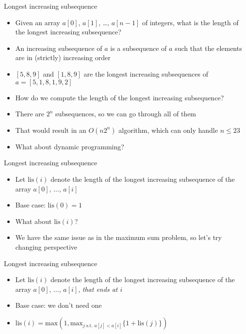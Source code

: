 \documentclass[12pt,t]{beamer}
\newcommand{\bi}{\begin{itemize}}
\newcommand{\ei}{\end{itemize}}
\begin{document}
\begin{frame}{Longest increasing subsequence}
    \bi
\item Given an array $a[0]$, $a[1]$, \ldots, $a[n-1]$ of integers, what is the length of the longest increasing subsequence?
    \vspace{5pt}
\item An increasing subsequence of $a$ is a subsequence of $a$ such that the elements are in (strictly) increasing order
    \vspace{5pt}
\item $[5,8,9]$ and $[1,8,9]$ are the longest increasing subsequences of $a = [5,1,8,1,9,2]$

    \vspace{5pt}
\item How do we compute the length of the longest increasing subsequence?
\item There are $2^n$ subsequences, so we can go through all of them
\item That would result in an $O(n2^n)$ algorithm, which can only handle $n\leq 23$
    \vspace{5pt}
\item What about dynamic programming?

    \ei
\end{frame}

\begin{frame}{Longest increasing subsequence}
    \vspace{20pt}
    \bi
\item Let $\mathrm{lis}(i)$ denote the length of the longest increasing subsequence of the array $a[0]$, $\ldots$, $a[i]$
    \vspace{5pt}
\item Base case: $\mathrm{lis}(0) = 1$
\item What about $\mathrm{lis}(i)$?
    \vspace{10pt}
\item We have the same issue as in the maximum sum problem, so let's try changing perspective
    \ei
\end{frame}

\begin{frame}{Longest increasing subsequence}
    \vspace{40pt}
    \bi
\item Let $\mathrm{lis}(i)$ denote the length of the longest increasing subsequence of the array $a[0]$, $\ldots$, $a[i]$, \textit{that ends at $i$}
    \vspace{5pt}
\item Base case: we don't need one
\item $\mathrm{lis}(i) = \mathrm{max}(1, \mathrm{max}_{j \textrm{ s.t. } a[j] < a[i]} \{ 1 + \mathrm{lis}(j) \})$
    \ei
\end{frame}
\end{document}
